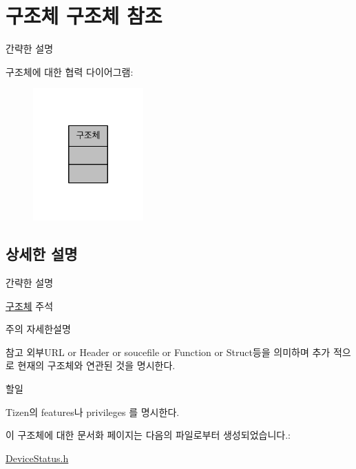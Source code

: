 \hypertarget{struct_xEA_xB5_xAC_xEC_xA1_xB0_xEC_xB2_xB4}{\section{구조체 구조체 참조}
\label{struct_xEA_xB5_xAC_xEC_xA1_xB0_xEC_xB2_xB4}
}


간략한 설명  




구조체에 대한 협력 다이어그램\-:\nopagebreak
\begin{figure}[H]
\begin{center}
\leavevmode
\includegraphics[width=120pt]{struct_xEA_xB5_xAC_xEC_xA1_xB0_xEC_xB2_xB4__coll__graph}
\end{center}
\end{figure}


\subsection{상세한 설명}
간략한 설명 

\hyperlink{struct_xEA_xB5_xAC_xEC_xA1_xB0_xEC_xB2_xB4}{구조체} 주석 \begin{DoxyNote}{주의}
자세한설명 
\end{DoxyNote}
\begin{DoxySeeAlso}{참고}
외부\-U\-R\-L or Header or soucefile or Function or Struct등을 의미하며 추가 적으로 현재의 구조체와 연관된 것을 명시한다. 
\end{DoxySeeAlso}
\begin{DoxyRefDesc}{할일}
\item[\hyperlink{todo__todo000006}{할일}]Tizen의 features나 privileges 를 명시한다. \end{DoxyRefDesc}


이 구조체에 대한 문서화 페이지는 다음의 파일로부터 생성되었습니다.\-:\begin{DoxyCompactItemize}
\item 
\hyperlink{_device_status_8h}{Device\-Status.\-h}\end{DoxyCompactItemize}
